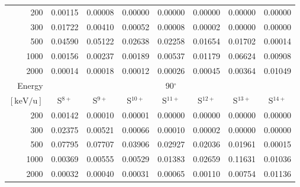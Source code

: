 \begin{table}[ht]
\begin{tabular}{r|c|c|c|c|c|c|c}
    200   & 0.00115 & 0.00008 & 0.00000 & 0.00000 & 0.00000 & 0.00000 & 0.00000 \\
    300   & 0.01722 & 0.00410 & 0.00052 & 0.00008 & 0.00002 & 0.00000 & 0.00000 \\
    500   & 0.04590 & 0.05122 & 0.02638 & 0.02258 & 0.01654 & 0.01702 & 0.00014 \\
    1000  & 0.00156 & 0.00237 & 0.00189 & 0.00537 & 0.01179 & 0.06624 & 0.00908 \\
    2000  & 0.00014 & 0.00018 & 0.00012 & 0.00026 & 0.00045 & 0.00364 & 0.01049 \\ \cline{1-8}
    Energy & \multicolumn{7}{c}{90$^\circ$} \\ \cline{2-8}
    $\mathrm{[keV/u]}$ & S$^{8+}$ & S$^{9+}$ & S$^{10+}$ & S$^{11+}$ & S$^{12+}$ & S$^{13+}$ & S$^{14+}$ \\ \cline{1-8}
    200   & 0.00142 & 0.00010 & 0.00001 & 0.00000 & 0.00000 & 0.00000 & 0.00000 \\
    300   & 0.02375 & 0.00521 & 0.00066 & 0.00010 & 0.00002 & 0.00000 & 0.00000 \\
    500   & 0.07795 & 0.07707 & 0.03906 & 0.02927 & 0.02036 & 0.01961 & 0.00015 \\
    1000  & 0.00369 & 0.00555 & 0.00529 & 0.01383 & 0.02659 & 0.11631 & 0.01036 \\
    2000  & 0.00032 & 0.00040 & 0.00031 & 0.00065 & 0.00110 & 0.00754 & 0.01136 \\ \cline{1-8}
    \end{tabular}
    \label{tab:XRayEffOCX2}
\end{table}

